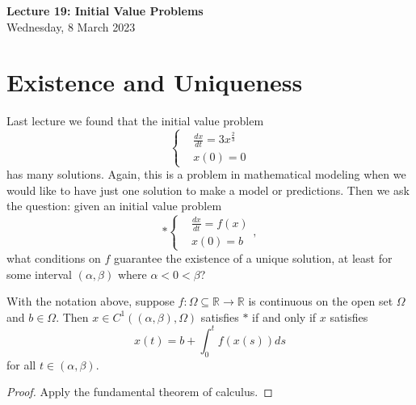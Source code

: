 \documentclass[11pt]{article}
\theoremstyle{definition}
\newcommand{\R}{\mathbb{R}}                      %
\begin{document}
\thispagestyle{empty}

\begin{center}
{\LARGE \bf Lecture 19: Initial Value Problems}\\
{\large Wednesday, 8 March 2023}\\
\end{center}

\section{Existence and Uniqueness}
Last lecture we found that the initial value problem
$$
\left\{\begin{aligned}
&\frac{dx}{dt}=3x^\frac{2}{3}\\
&x(0)=0
\end{aligned}\right.
$$
has many solutions. Again, this is a problem in mathematical modeling when we would like to have just one solution to make a model or predictions. Then we ask the question: given an initial value problem
$$
*\left\{\begin{aligned}
    &\frac{dx}{dt}=f(x)\\
    &x(0)=b
\end{aligned}\right.,
$$
what conditions on $f$ guarantee the existence of a unique solution, at least for some interval $(\alpha,\beta)$ where $\alpha<0<\beta$?

\prop With the notation above, suppose $f:\Omega\subseteq \R\to \R$ is continuous on the open set $\Omega$ and $b\in\Omega$. Then $x\in C^1((\alpha,\beta),\Omega)$ satisfies $*$ if and only if $x$ satisfies
$$
x(t)=b+\int_0^t f(x(s))ds
$$
for all $t\in(\alpha,\beta)$. 

\begin{proof}
Apply the fundamental theorem of calculus.
\end{proof}
\end{document}
